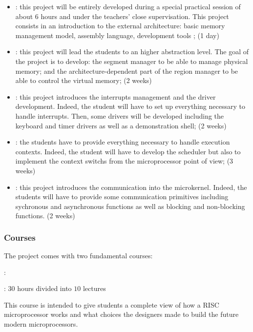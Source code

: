 \begin{multicols}{2}
\begin{itemize}
  \item
    : this project will be entirely developed during a
    special practical session of about 6 hours and under the teachers' close
    supervisation. This project consists in an introduction to the
     external architecture: basic memory management model,
     assembly language, development tools \etc{}; (1 day)
  \item
    : this project will lead the students to an higher abstraction
    level. The goal of the project is to develop: the segment manager to be
    able to manage physical memory; and the architecture-dependent part of the
    region manager to be able to control the virtual memory; (2 weeks)
  \item
    : this project introduces the interrupts management and
    the driver development. Indeed, the student will have to set up
    everything necessary to handle interrupts. Then, some drivers will
    be developed including the keyboard and timer drivers as well as a
    demonstration shell; (2 weeks)
  \item
    : the students have to provide everything necessary
    to handle execution contexts. Indeed, the student will have to
    develop the scheduler but also to implement the context switchs from
    the microprocessor point of view; (3 weeks)
  \item
    : this project introduces the communication into the
    microkernel. Indeed, the students will have to provide some
    communication primitives including sychronous and asynchronous
    functions as well as blocking and non-blocking functions. (2 weeks)
\end{itemize}


\subsubsection{Courses}

The project comes with two fundamental courses:


: 

: $30$ hours divided into $10$ lectures

This course is intended to give students a complete view of how a RISC
microprocessor works and what choices the designers made to build the
future modern microprocessors.


\end{multicols}
